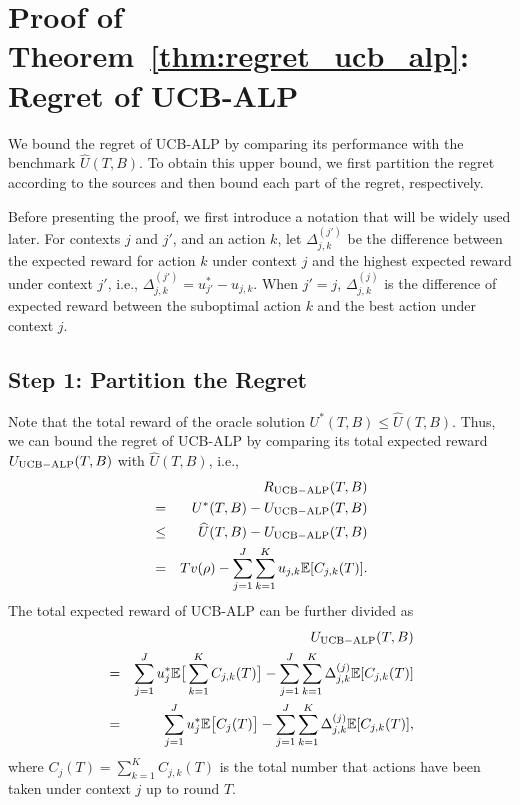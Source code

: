 
\section{Proof of Theorem~\ref{thm:regret_ucb_alp}: Regret of UCB-ALP}
We bound the regret of UCB-ALP by comparing its performance  with the benchmark $\widehat{U}(T,B)$. To obtain this upper bound, we first partition the regret according to the sources and then bound each part of the regret, respectively.

Before presenting the proof, we first introduce a notation that will be widely used later. For contexts $j$ and $j'$, and an action $k$, let $\Delta_{j,k}^{(j')}$ be the difference between the expected reward for action $k$ under context $j$ and the highest expected reward under context $j'$, i.e., $\Delta_{j,k}^{(j')} = u_{j'}^* - u_{j,k}$.
When $j' = j$, $\Delta_{j,k}^{(j)}$ is the difference of expected reward between the suboptimal action $k$ and the best action under context $j$.


\subsection{Step 1: Partition the Regret}

Note that the total reward of the oracle solution $U^*(T,B)  \leq \widehat{U}(T,B)$. Thus, we can bound the regret of UCB-ALP by comparing its total expected reward $U_{\rm UCB-ALP}(T,B)$ with $\widehat{U}(T,B)$, i.e.,
\begin{eqnarray}
&&R_{\rm {UCB-ALP}}(T, B) \nonumber \\
&=& U^*(T,B) - U_{\rm UCB-ALP}(T,B) \nonumber \\
& \leq &\widehat{U}(T,B) - U_{\rm UCB-ALP}(T,B) \nonumber\\
&= & T v(\rho) - \sum_{j = 1}^J \sum_{k =1}^K u_{j,k} \mathbb{E}[C_{j,k}(T)].
\end{eqnarray}
The total expected reward of UCB-ALP can be further divided as
\begin{eqnarray}
&& U_{\rm UCB-ALP}(T,B) \nonumber \\
& =&  \sum_{j = 1}^J u_j^* \mathbb{E}\big[\sum_{k=1}^K C_{j,k}(T)\big] - \sum_{j=1}^J \sum_{k=1}^K \Delta_{j,k}^{(j)}\mathbb{E}[C_{j,k}(T)] \nonumber \\
& =&  \sum_{j = 1}^J u_j^*\mathbb{E}\big[C_{j}(T)\big] - \sum_{j=1}^J \sum_{k=1}^K \Delta_{j,k}^{(j)}\mathbb{E}[C_{j,k}(T)], \nonumber
\end{eqnarray}
where $C_j(T) = \sum_{k=1}^K C_{j,k}(T)$ is the total number that actions have been taken under context $j$ up to round $T$.

